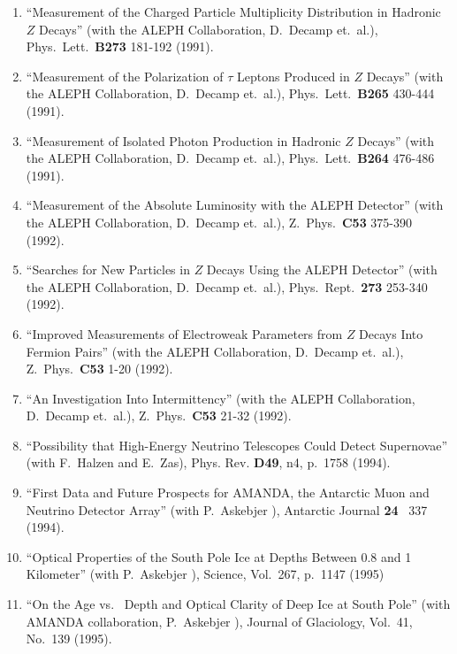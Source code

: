 \begin{enumerate}
\item ``Measurement of the Charged Particle Multiplicity Distribution
  in Hadronic $Z$ Decays'' (with the ALEPH Collaboration, D.~Decamp
  et.~al.), Phys.~Lett.~{\bf B273} 181-192 (1991).

\item ``Measurement of the Polarization of $\tau$ Leptons Produced in
  $Z$ Decays'' (with the ALEPH Collaboration, D.~Decamp et.~al.),
  Phys.~Lett.~{\bf B265} 430-444 (1991).

\item ``Measurement of Isolated Photon Production in Hadronic $Z$
  Decays'' (with the ALEPH Collaboration, D.~Decamp et.~al.),
  Phys.~Lett.~{\bf B264} 476-486 (1991).

\item ``Measurement of the Absolute Luminosity with the ALEPH
  Detector'' (with the ALEPH Collaboration, D.~Decamp et.~al.),
  Z.~Phys.~{\bf C53} 375-390 (1992).

\item ``Searches for New Particles in $Z$ Decays Using the ALEPH
  Detector'' (with the ALEPH Collaboration, D.~Decamp et.~al.),
  Phys.~Rept.~{\bf 273} 253-340 (1992).

\item ``Improved Measurements of Electroweak Parameters from $Z$
  Decays Into Fermion Pairs'' (with the ALEPH Collaboration, D.~Decamp
  et.~al.), Z.~Phys.~{\bf C53} 1-20 (1992).

\item ``An Investigation Into Intermittency'' (with the ALEPH
  Collaboration, D.~Decamp et.~al.), Z.~Phys.~{\bf C53} 21-32 (1992).

\item ``Possibility that High-Energy Neutrino Telescopes Could Detect
  Supernovae'' (with F.~Halzen and E.~Zas), Phys. Rev. {\bf D49}, n4,
  p.~1758 (1994).

\item ``First Data and Future Prospects for AMANDA, the Antarctic Muon
  and Neutrino Detector Array'' (with P.~Askebjer \etal), Antarctic
  Journal {\bf 24} \, 337 (1994).

\item ``Optical Properties of the South Pole Ice at Depths Between 0.8
  and 1 Kilometer'' (with P.~Askebjer \etal), Science, Vol.~267,
  p.~1147 (1995)

\item ``On the Age vs.~ Depth and Optical Clarity of Deep Ice at South
  Pole'' (with AMANDA collaboration, P.~Askebjer \etal), Journal of
  Glaciology, Vol.~41, No.~139 (1995).


\end{enumerate}
